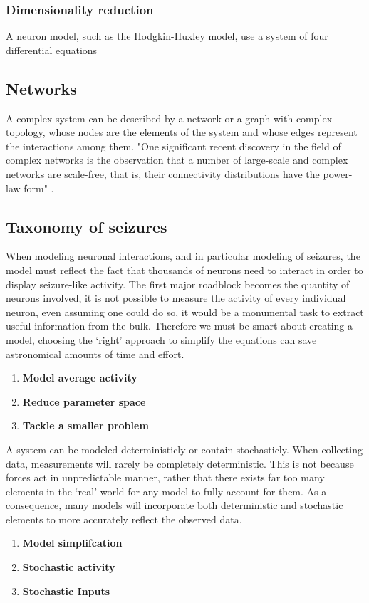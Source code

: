 \documentclass[../../Orator.tex]{subfiles}
\begin{document}
\subsubsection{Dimensionality reduction}
A neuron model, such as the Hodgkin-Huxley model, use a system of four differential equations

\subsection*{Networks}
A complex system can be described by a network or a graph with complex topology, whose nodes are the elements of the system and whose edges represent the interactions among them. "One significant recent discovery in the field of complex networks is the observation that a number of
large-scale and complex networks are scale-free, that is, their connectivity distributions have the
power-law form" \cite{wang2002synchronization}.




\subsection*{Taxonomy of seizures}


When modeling neuronal interactions, and in particular modeling of seizures, the model must reflect the fact that thousands of neurons need to interact in order to display seizure-like activity. 
The first major roadblock becomes the quantity of neurons involved, it is not possible to measure the activity of every individual neuron, even assuming one could do so, it would be a monumental task to extract useful information from the bulk. 
Therefore we must be smart about creating a model, choosing the `right' approach to simplify the equations can save astronomical amounts of time and effort.
\begin{enumerate}
    \item \textbf{Model average activity}
    \item \textbf{Reduce parameter space}
    \item \textbf{Tackle a smaller problem}
\end{enumerate}


A system can be modeled deterministicly or contain stochasticly. When collecting data, measurements will rarely be completely deterministic. This is not because forces act in unpredictable manner, rather that there exists far too many elements in the `real' world for any model to fully account for them. 
As a consequence, many models will incorporate both deterministic and stochastic elements to more accurately reflect the observed data.
\begin{enumerate}
    \item \textbf{Model simplifcation}
    \item \textbf{Stochastic activity}
    \item \textbf{Stochastic Inputs}
\end{enumerate}
\end{document}
